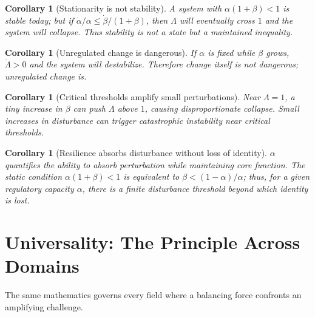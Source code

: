 \documentclass[11pt]{article}
\newtheorem{corollary}[theorem]{Corollary}
\begin{document}
\begin{corollary}[Stationarity is not stability]
\label{cor:notstate}
A system with $\alpha(1+\beta)<1$ is stable today; but if $\dot\alpha/\alpha \le \dot\beta/(1+\beta)$, then $\Lambda$ will eventually cross $1$ and the system will collapse.  Thus \emph{stability is not a state but a maintained inequality}.
\end{corollary}

\begin{corollary}[Unregulated change is dangerous]
\label{cor:unreg}
If $\alpha$ is fixed while $\beta$ grows, $\dot\Lambda>0$ and the system will destabilize.  Therefore \emph{change itself is not dangerous; unregulated change is}.
\end{corollary}

\begin{corollary}[Critical thresholds amplify small perturbations]
\label{cor:threshold}
Near $\Lambda=1$, a tiny increase in $\beta$ can push $\Lambda$ above $1$, causing disproportionate collapse.  \emph{Small increases in disturbance can trigger catastrophic instability near critical thresholds.}
\end{corollary}

\begin{corollary}[Resilience absorbs disturbance without loss of identity]
\label{cor:resilience}
$\alpha$ quantifies the ability to absorb perturbation while maintaining core function.  The static condition $\alpha(1+\beta)<1$ is equivalent to $\beta < (1-\alpha)/\alpha$; thus, for a given regulatory capacity $\alpha$, there is a finite disturbance threshold beyond which identity is lost.
\end{corollary}

\section{Universality: The Principle Across Domains}
The same mathematics governs every field where a balancing force confronts an amplifying challenge.
\end{document}

